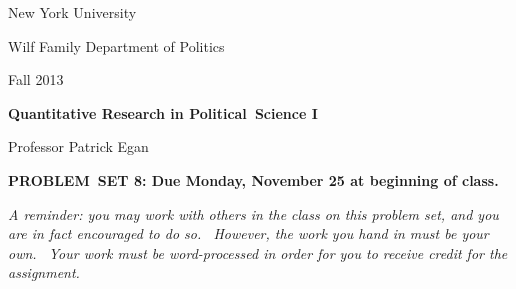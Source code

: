 \documentclass[11pt]{article}
\begin{document}
New York University

Wilf Family Department of Politics

Fall 2013

\begin{center}
{\large \textbf{Quantitative Research in Political\ Science I}}

Professor Patrick Egan

\bigskip

\textbf{PROBLEM\ SET 8: Due Monday, November 25 at beginning of class.}
\end{center}

\textit{A reminder: you may work with others in the class on this problem
set, and you are in fact encouraged to do so. \ However, the work you hand
in must be your own. \ Your work must be word-processed in order for you to
receive credit for the assignment.}
\end{document}
